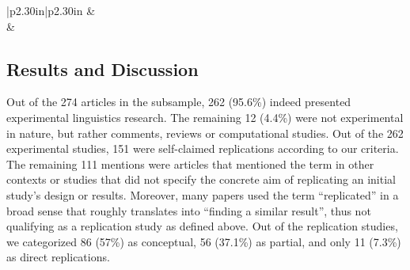 \documentclass[cm,linguex]{glossa}
\begin{document}
\begin{longtable}[c]{|p{2.30in}|p{2.30in}}
 &  \\





 &  \\




\end{longtable}

\hypertarget{results-and-discussion-1}{%
\subsection{Results and Discussion}\label{results-and-discussion-1}}

Out of the 274 articles in the subsample, 262 (95.6\%) indeed presented experimental linguistics research. The remaining 12 (4.4\%) were not experimental in nature, but rather comments, reviews or computational studies. Out of the 262 experimental studies, 151 were self-claimed replications according to our criteria. The remaining 111 mentions were articles that mentioned the term in other contexts or studies that did not specify the concrete aim of replicating an initial study's design or results. Moreover, many papers used the term ``replicated'' in a broad sense that roughly translates into ``finding a similar result'', thus not qualifying as a replication study as defined above.
Out of the replication studies, we categorized 86 (57\%) as conceptual, 56 (37.1\%) as partial, and only 11 (7.3\%) as direct replications.
\end{document}
